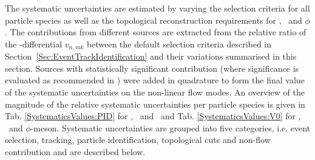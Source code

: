 \documentclass[ALICE,manyauthors]{cernphprep}
\begin{document}
The systematic uncertainties are estimated by varying the selection criteria for all particle species as well as the topological reconstruction requirements for \Ks, \lambdas~and $\phi$. The contributions from different sources are extracted from the relative ratio of the \pT-differential $v_{n,mk}$ between the default selection criteria described in Section~\ref{Sec:EventTrackIdentification} and their variations summarised in this section. Sources with statistically significant contribution (where significance is evaluated as recommended in \cite{Barlow:2002yb}) were added in quadrature to form the final value of the systematic uncertainties on the non-linear flow modes. 
An overview of the magnitude of the relative systematic uncertainties per particle species is given in Tab. \ref{SystematicsValues:PID} for \pion, \kaon~and \proton~and Tab. \ref{SystematicsValues:V0} for \Ks, \lambdas~and $\phi$-meson. Systematic uncertainties are grouped into five categories, i.e. event selection, tracking, particle identification, topological cuts and non-flow contribution and are described below.


\end{document}
